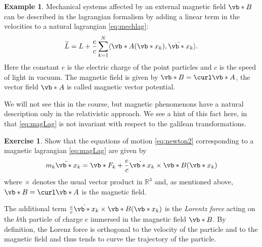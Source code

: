 \documentclass[english,fontsize=11pt,paper=b5]{scrbook}
\theoremstyle{definition}
\newtheorem{example}{Example}[chapter]
\newtheorem{exercise}{Exercise}[chapter]
\newcommand{\emphidx}[1]{\index{#1}\emph{#1}}
\begin{document}
    \begin{example}\label{exa:magnetic}
      Mechanical systems affected by an external magnetic field $\vb* B$ can be described in the lagrangian formalism by adding a linear term in the velocities to a natural lagrangian \eqref{eq:mechlag}:
      \begin{equation}\label{eq:magLag}
        \widetilde L = L + \frac ec \sum_{k=1}^N \langle\vb* A(\vb*{x}_k), \dot{\vb*{x}}_k\rangle.
      \end{equation}
      Here the constant $e$ is the electric charge of the point particles and $c$ is the speed of light in vacuum.
      The magnetic field is given by $\vb* B = \curl \vb* A$, the vector field $\vb* A$ is called magnetic vector potential.

      We will not see this in the course, but magnetic phenomenons have a natural description only in the relativistic approach. We see a hint of this fact here, in that \eqref{eq:magLag} is not invariant with respect to the galilean transformations.

      \begin{exercise}\label{exe:magnetic}
        Show that the equations of motion \eqref{eq:newton2} corresponding to a magnetic lagrangian \eqref{eq:magLag} are given by
        \begin{equation}
          m_k \ddot{\vb*{x}}_k = \vb*{F}_k + \frac ec \dot{\vb*{x}}_k \times \vb* B(\vb*{x}_k)
        \end{equation}
        where $\times$ denotes the usual vector product in $\mathbb{R}^3$ and, as mentioned above, $\vb* B = \curl \vb* A$ is the magnetic field.

        The additional term $\frac ec \dot{\vb*{x}}_k\times \vb* B(\vb*{x}_k)$ is the \emphidx{Lorentz force} acting on the $k$th particle of charge $e$ immersed in the magnetic field $\vb* B$. By definition, the Lorenz force is orthogonal to the velocity of the particle and to the magnetic field and thus tends to curve the trajectory of the particle.



\end{exercise}
\end{example}
\end{document}
